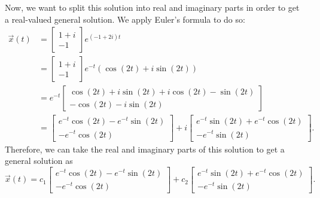 \documentclass{ximera}
\begin{document}
\begin{exampleSol}
    Now, we want to split this solution into real and imaginary parts in order to get a real-valued general solution. We apply Euler's formula to do so:
    \begin{equation*}
        \begin{split}
            \vec{x}(t) &= 
            \begin{bmatrix} 
                1+i \\ 
                -1 
            \end{bmatrix} 
            e^{(-1 + 2i)t} \\
            &= 
            \begin{bmatrix} 
                1+i \\ 
                -1 
            \end{bmatrix} 
            e^{-t}(\cos(2t) + i\sin(2t)) \\
            &= e^{-t} 
            \begin{bmatrix} 
                \cos(2t) + i\sin(2t)+i\cos(2t) - \sin(2t) \\ 
                -\cos(2t) - i\sin(2t)  
            \end{bmatrix} \\
            &= 
            \begin{bmatrix} 
                e^{-t}\cos(2t) - e^{-t}\sin(2t) \\ 
                -e^{-t}\cos(2t)
            \end{bmatrix} + i
            \begin{bmatrix} 
                e^{-t}\sin(2t) + e^{-t}\cos(2t) \\ 
                -e^{-t}\sin(2t) 
            \end{bmatrix}.
        \end{split}
    \end{equation*}
    Therefore, we can take the real and imaginary parts of this solution to get a general solution as
    \begin{equation*}
        \vec{x}(t) = c_1 
        \begin{bmatrix} 
            e^{-t}\cos(2t) - e^{-t}\sin(2t) \\ 
            -e^{-t}\cos(2t)
        \end{bmatrix} 
        +  c_2
        \begin{bmatrix} 
            e^{-t}\sin(2t) + e^{-t}\cos(2t) \\ 
            -e^{-t}\sin(2t) 
        \end{bmatrix}.
    \end{equation*}
    

\end{exampleSol}
\end{document}
